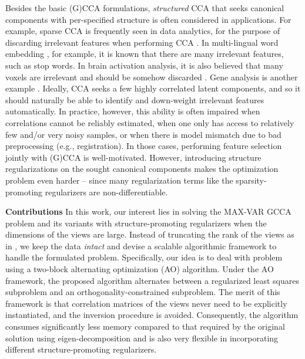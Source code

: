 \documentclass[10pt,journal]{IEEEtran}
\begin{document}
Besides the basic (G)CCA formulations, \emph{structured} CCA \cite{hardoon2011sparse} that
seeks canonical components with per-specified structure is often considered in applications.
For example, sparse CCA is frequently seen in data analytics, for the purpose of discarding irrelevant features when performing CCA \cite{witten2009penalized,chen2012structured,witten2009extensions}.
In multi-lingual word embedding \cite{faruqui2014improving,sun2011canonical,rastogimultiview}, for example, it is known that there are many irrelevant features, such as stop words. In brain activation analysis, it is also believed that many voxels are irrelevant and should be somehow discarded \cite{rustandi2009integrating,mitchell2008predicting}. Gene analysis is another example \cite{witten2009penalized,chen2012structured,witten2009extensions}.
Ideally, CCA seeks a few highly correlated latent components, and so it should naturally be able to identify and down-weight irrelevant features automatically. In practice, however, this ability is often impaired when correlations cannot be reliably estimated, when one only has access to relatively few and/or very noisy samples, or when there is model mismatch due to bad preprocessing (e.g., registration). In those cases, performing feature selection jointly with (G)CCA is well-motivated. However, introducing structure regularizations on the sought canonical components makes the optimization problem even harder -- since many regularization terms like the sparsity-promoting regularizers are non-differentiable.

\bigskip

\noindent
{\bf Contributions}
In this work, our interest lies in solving the MAX-VAR GCCA problem and its variants with structure-promoting regularizers when the dimensions of the views are large.
Instead of truncating the rank of the views as in \cite{rastogimultiview}, we keep the data \emph{intact} and devise a scalable algorithmic framework to handle the formulated problem.
Specifically, our idea is to deal with problem using a two-block alternating optimization (AO) algorithm.
Under the AO framework, the proposed algorithm alternates between a regularized least squares subproblem and an orthogonality-constrained subproblem.
The merit of this framework is that correlation matrices of the views never need to be explicitly instantiated, and the inversion procedure is avoided. 
Consequently, the algorithm consumes significantly less memory compared to that required by the original solution using eigen-decomposition and is also very flexible in incorporating different structure-promoting regularizers.
\end{document}
